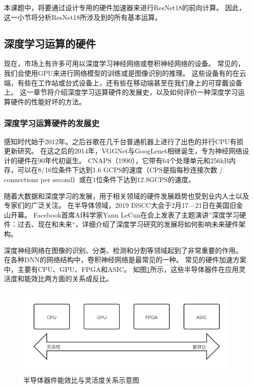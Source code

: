 本课题中，将要通过设计专用的硬件加速器来进行ResNet18的前向计算。
因此，这一小节将分析ResNet18所涉及到的所有基本运算。


\subsection{深度学习运算的硬件}
现在，市场上有许多可用以深度学习神经网络或卷积神经网络的设备。
常见的，我们会使用GPU来进行网络模型的训练或是图像识别的推理。
这些设备有的在云端，有些在工作站或台式设备上，还有些在移动端甚至在我们身上的可穿戴设备上。
这一章节将介绍深度学习运算硬件的发展史，以及如何评价一种深度学习运算硬件的性能好坏的方法。


\subsubsection{深度学习运算硬件的发展史}

感知时代始于2012年。之后谷歌在几千台普通机器上进行了出色的并行CPU有损更新研究。
在这之后的2014年，VGGNet与GoogLenet相继诞生，专为神经网络设计的硬件在90年代初诞生。
CNAPS（1990），它带有64个处理单元和256kB内存，可以在8/16位条件下达到1.6 GCPS的速度（CPS是指每秒连接次数 / connections per second）或在1位条件下达到12.8GCPS的速度\cite{Heemskerk1995OverviewON}。

随着大数据和深度学习的发展，用于相关领域的硬件发展趋势也受到业内人士以及专家们的广泛关注。
在半导体领域，2019 ISSCC大会于2月17—21日在美国旧金山开幕。
Facebook首席AI科学家Yann LeCun在会上发表了主题演讲”深度学习硬件：过去、现在和未来“，详细介绍了深度学习研究的发展将如何影响未来硬件架构\cite{Yann2019DeepLH}。


深度神经网络在图像的识别、分类、检测和分割等领域起到了非常重要的作用。
在各种DNN的网络结构中，卷积神经网络是最常见的一种。
常见的硬件加速方案中，主要有CPU、GPU、FPGA和ASIC。
如图\ref{fig:silicon_alternatives}所示，这些半导体器件在应用灵活度和能效比两方面的关系成反比。  
\begin{figure}[htbp]
    \centering
    \includegraphics[width=15cm,height=4.5cm]{figures/silicon_alternatives.png}
    \caption{半导体器件能效比与灵活度关系示意图}
    \label{fig:silicon_alternatives}
\end{figure}

